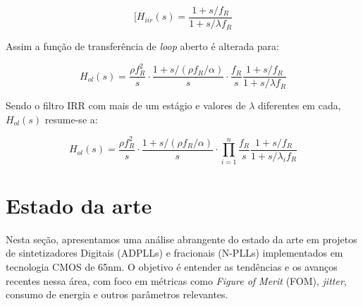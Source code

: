 	\begin{equation}
	[H_{iir}(s) = \frac{ 1 + s/f_R}{ 1 + s/\lambda f_R}
	\label{eq:irr_s_domain}
	\end{equation}
	
Assim a função de transferência de \textit{loop} aberto é alterada para:


\begin{equation}
	H_{ol}(s) = \frac{\rho f_R^2}{s} \cdot \frac{1 + s/(\rho f_R / \alpha)}{s} \cdot \frac{f_R}{s} \frac{ 1 + s/f_R}{ 1 + s/\lambda f_R}
	\label{eq:hol_irr_simgle}
\end{equation}


Sendo o filtro IRR com mais de um estágio e valores de $\lambda$ diferentes em cada,  $H_{ol}(s)$ resume-se a:

\begin{equation}
H_{ol}(s) = \frac{\rho f_R^2}{s} \cdot \frac{1 + s/(\rho f_R / \alpha)}{s} \cdot \prod_{i=1}^{n} \frac{f_R}{s} \frac{ 1 + s/f_R}{ 1 + s/\lambda_i f_R}
	\label{eq:hol_irr_cascade}
\end{equation}


\section{Estado da arte}

Nesta seção, apresentamos uma análise abrangente do estado da arte em projetos de sintetizadores Digitais (ADPLLs) e fracionais (N-PLLs) implementados em tecnologia CMOS de 65nm. O objetivo é entender as tendências e os avanços recentes nessa área, com foco em métricas como \textit{Figure of Merit} (FOM), \textit{jitter}, consumo de energia e outros parâmetros relevantes.


